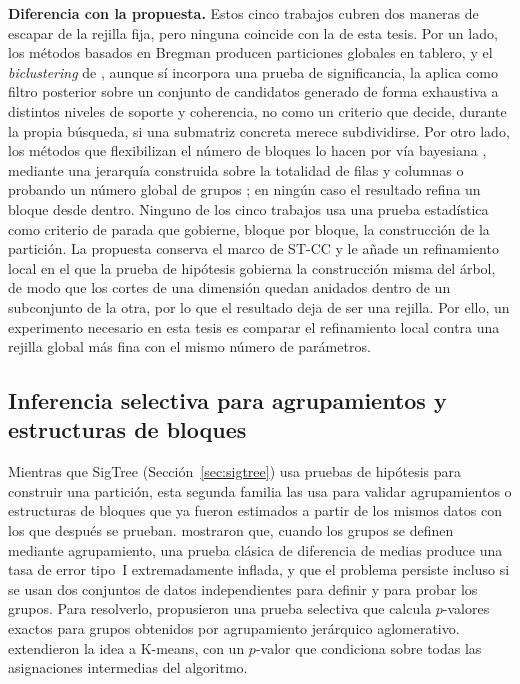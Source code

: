 \textbf{Diferencia con la propuesta.} Estos cinco trabajos cubren dos
maneras de escapar de la rejilla fija, pero ninguna coincide con la de esta
tesis. Por un lado, los métodos basados en Bregman producen particiones
globales en tablero, y el \emph{biclustering} de \citet{Neves2022}, aunque sí
incorpora una prueba de significancia, la aplica como filtro
posterior sobre un conjunto de candidatos generado de forma
exhaustiva a distintos niveles de soporte y coherencia, no como un criterio
que decide, durante la propia búsqueda, si una submatriz concreta merece
subdividirse. Por otro lado, los métodos que flexibilizan el número de
bloques lo hacen por vía bayesiana \citep{Yen2020}, mediante una jerarquía
construida sobre la totalidad de filas y columnas \citep{Sugahara2023} o
probando un número global de grupos \citep{Watanabe2021gof}; en ningún caso el
resultado refina un bloque desde dentro.
Ninguno de los cinco trabajos usa una prueba estadística como criterio de
parada que gobierne, bloque por bloque, la construcción de la
partición. La propuesta conserva el marco de \ac{ST-CC} y le añade un
refinamiento local en el que la prueba de hipótesis gobierna la
construcción misma del árbol, de modo que los cortes de una dimensión quedan
anidados dentro de un subconjunto de la otra, por lo que el resultado deja de ser
una rejilla. Por ello, un experimento necesario en esta tesis es comparar el
refinamiento local contra una rejilla global más fina con el mismo número
de parámetros.

\subsection{Inferencia selectiva para agrupamientos y estructuras de bloques}
\label{sec:ea_inferencia}

Mientras que SigTree (Sección~\ref{sec:sigtree}) usa pruebas de
hipótesis para construir una partición, esta segunda familia las usa
para validar agrupamientos o estructuras de bloques que ya fueron
estimados a partir de los mismos datos con los que después se prueban.
\citet{Gao2024} mostraron que, cuando los grupos se definen mediante
agrupamiento, una prueba clásica de diferencia de medias produce una tasa de
error tipo~I extremadamente inflada, y que el problema persiste incluso si
se usan dos conjuntos de datos independientes para definir y para probar los
grupos. Para resolverlo, propusieron una prueba selectiva que calcula
$p$-valores exactos para grupos obtenidos por agrupamiento jerárquico
aglomerativo. \citet{Chen2023} extendieron la idea a K-means, con un
$p$-valor que condiciona sobre todas las asignaciones intermedias del
algoritmo.

